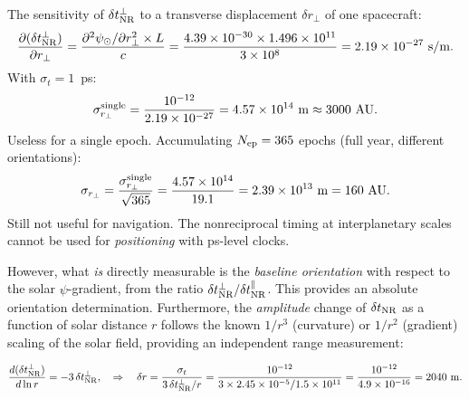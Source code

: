 \documentclass[aps,prd,twocolumn,superscriptaddress,nofootinbib,longbibliography]{revtex4-2}
\begin{document}
The sensitivity of $\delta t_{\rm NR}^{\perp}$ to a transverse
displacement $\delta r_\perp$ of one spacecraft:
\begin{equation}
\frac{\partial(\delta t_{\rm NR}^{\perp})}{\partial r_\perp}
= \frac{\partial^2\psi_\odot/\partial r_\perp^2\times L}{c}
= \frac{4.39\times10^{-30}\times1.496\times10^{11}}{3\times10^8}
= 2.19\times10^{-27}\ \si{s/m}.
\end{equation}
With $\sigma_t = 1$~ps:
\begin{equation}
\sigma_{r_\perp}^{\rm single} = \frac{10^{-12}}{2.19\times10^{-27}}
= 4.57\times10^{14}\ \si{m} \approx 3000\ \si{AU}.
\end{equation}
Useless for a single epoch.  Accumulating $N_{\rm ep} = 365$
epochs (full year, different orientations):
\begin{equation}
\sigma_{r_\perp} = \frac{\sigma_{r_\perp}^{\rm single}}{\sqrt{365}}
= \frac{4.57\times10^{14}}{19.1} = 2.39\times10^{13}\ \si{m} = 160\ \si{AU}.
\end{equation}
Still not useful for navigation.  The nonreciprocal timing at
interplanetary scales cannot be used for \emph{positioning} with
ps-level clocks.

However, what \emph{is} directly measurable is the \emph{baseline
orientation} with respect to the solar $\psi$-gradient, from
the ratio $\delta t_{\rm NR}^{\perp}/\delta t_{\rm NR}^{\parallel}$.
This provides an absolute orientation determination.  Furthermore,
the \emph{amplitude} change of $\delta t_{\rm NR}$ as a function
of solar distance $r$ follows the known $1/r^3$ (curvature) or
$1/r^2$ (gradient) scaling of the solar field, providing an
independent range measurement:

\begin{equation}
\frac{d(\delta t_{\rm NR}^{\perp})}{d\ln r} = -3\,\delta t_{\rm NR}^{\perp},
\quad\Rightarrow\quad
\delta r = \frac{\sigma_t}{3\,\delta t_{\rm NR}^{\perp}/r}
= \frac{10^{-12}}{3\times2.45\times10^{-5}/1.5\times10^{11}}
= \frac{10^{-12}}{4.9\times10^{-16}} = 2040\ \si{m}.
\end{equation}
\end{document}

